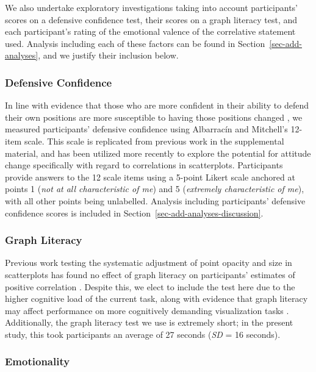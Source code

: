 \documentclass[manuscript,screen,review,anonymous]{acmart}
\begin{document}
We also undertake exploratory investigations taking into account
participants' scores on a defensive confidence test, their scores on a
graph literacy test, and each participant's rating of the emotional
valence of the correlative statement used. Analysis including each of
these factors can be found in Section~\ref{sec-add-analyses}, and we
justify their inclusion below.

\subsubsection{Defensive Confidence}\label{sec-def-con}

In line with evidence that those who are more confident in their ability
to defend their own positions are more susceptible to having those
positions changed \citep{albarracin_2004}, we measured participants'
defensive confidence using Albarracín and Mitchell's
\citep{albarracin_2004} 12-item scale. This scale is replicated from
previous work in the supplemental material, and has been utilized more
recently \citep{markant_2023} to explore the potential for attitude
change specifically with regard to correlations in scatterplots.
Participants provide answers to the 12 scale items using a 5-point
Likert scale anchored at points 1 (\emph{not at all characteristic of
me}) and 5 (\emph{extremely characteristic of me}), with all other
points being unlabelled. Analysis including participants' defensive
confidence scores is included in
Section~\ref{sec-add-analyses-discussion}.

\subsubsection{Graph Literacy}\label{sec-graph-lit}

Previous work testing the systematic adjustment of point opacity and
size in scatterplots has found no effect of graph literacy on
participants' estimates of positive correlation
\citep{strain_2023, strain_2023b, strain_2024}. Despite this, we elect
to include the test here due to the higher cognitive load of the current
task, along with evidence that graph literacy may affect performance on
more cognitively demanding visualization tasks
\citep{canham_2010, okan_2012}. Additionally, the graph literacy test we
use \citep{garcia_2016} is extremely short; in the present study, this
took participants an average of 27 seconds (\emph{SD} = 16 seconds).

\subsubsection{Emotionality}\label{sec-emotionality}
\end{document}
